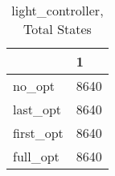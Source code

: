 \begin{table}
\caption{light\_controller, Total States}
\label{light_controller_total}
\begin{tabular}{ll}
\toprule
 & 1 \\
\midrule
no\_opt & 8640 \\
last\_opt & 8640 \\
first\_opt & 8640 \\
full\_opt & 8640 \\
\bottomrule
\end{tabular}
\end{table}
